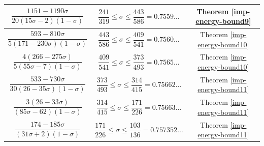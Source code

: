 \begin{table}[ht]
\begin{tabular}{|c|c|c|}
    $\dfrac{1151 - 1190\sigma}{20(15\sigma - 2)(1-\sigma)}$ & $\dfrac{241}{319} \le \sigma \le \dfrac{443}{586} = 0.7559\ldots$ & Theorem \ref{imp-energy-bound9}\\
    \hline
    $\dfrac{593 - 810\sigma}{5(171 - 230\sigma)(1-\sigma)}$ & $\dfrac{443}{586} \le \sigma \le \dfrac{409}{541} = 0.7560\ldots$ & Theorem \ref{imp-energy-bound10}\\
    \hline

    $\dfrac{4(266 - 275\sigma)}{5(55\sigma - 7)(1-\sigma)}$ & $\dfrac{409}{541} \le \sigma \le \dfrac{373}{493} = 0.7565\ldots$ & Theorem \ref{imp-energy-bound10}\\
    \hline
    $\dfrac{533 - 730\sigma}{30(26 - 35\sigma)(1-\sigma)}$ & $\dfrac{373}{493} \le \sigma \le \dfrac{314}{415} = 0.75662\ldots$ & Theorem \ref{imp-energy-bound11}\\
    \hline

    $\dfrac{3(26 - 33\sigma)}{(85\sigma - 62)(1-\sigma)}$ & $\dfrac{314}{415} \le \sigma \le \dfrac{171}{226} = 0.75663\ldots$ & Theorem \ref{imp-energy-bound11}\\
    \hline
    $\dfrac{174 - 185\sigma}{(31\sigma + 2)(1-\sigma)}$ & $\dfrac{171}{226} \le \sigma \le \dfrac{103}{136} = 0.757352\ldots$ & Theorem \ref{imp-energy-bound11}\\
    \hline


\end{tabular}
\end{table}
